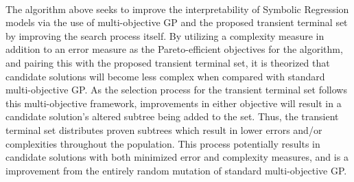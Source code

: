 \documentclass[a4paper]{article}
\begin{document}
\paragraph{} The algorithm above seeks to improve the interpretability of Symbolic Regression models via the use of multi-objective GP and the proposed transient terminal set by improving the search process itself. By utilizing a complexity measure in addition to an error measure as the Pareto-efficient objectives for the algorithm, and pairing this with the proposed transient terminal set, it is theorized that candidate solutions will become less complex when compared with standard multi-objective GP. As the selection process for the transient terminal set follows this multi-objective framework, improvements in either objective will result in a candidate solution's altered subtree being added to the set. Thus, the transient terminal set distributes proven subtrees which result in lower errors and/or complexities throughout the population. This process potentially results in candidate solutions with both minimized error and complexity measures, and is a improvement from the entirely random mutation of standard multi-objective GP.
\end{document}
